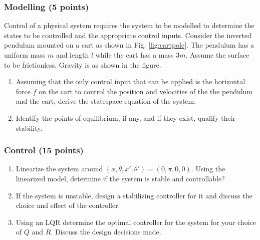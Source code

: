 \documentclass{article}
\newcommand{\?}{\stackrel{?}{=}}
\begin{document}
\subsubsection{Modelling (5 points)}
Control of a physical system requires the system to be modelled to determine the states to be controlled and the appropriate control inputs. Consider the inverted pendulum mounted on a cart as shown in Fig. \ref{fig:cartpole}. The pendulum has a uniform mass $m$ and length $l$ while the cart has a mass $3m$. Assume the surface to be frictionless. Gravity is as shown in the figure.
\begin{enumerate}
	\item Assuming that the only control input that can be applied is the horizontal force $f$ on the cart to control the position and velocities of the the pendulum and the cart, derive the statespace equation of the system. 
	\item Identify the points of equilibrium, if any, and if they exist, qualify their stability.
\end{enumerate}

\subsubsection{Control (15 points)}
\begin{enumerate}
	\item Linearize the system around $(x, \theta, x', \theta') = (0, \pi, 0, 0)$. Using the linearized model, determine if the system is stable and controllable?
	\item If the system is unstable, design \emph{a} stabilizing controller for it and discuss the choice and effect of the controller.
	\item Using an LQR determine the optimal controller for the system for your choice of $Q$ and $R$. Discuss the design decisions made.
\end{enumerate}
\end{document}
